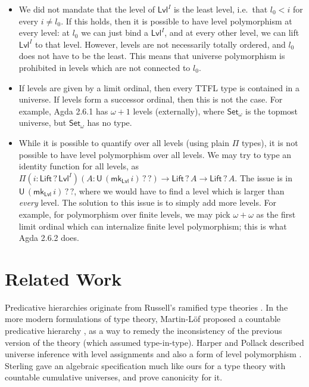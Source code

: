 \documentclass[a4paper,UKenglish,cleveref, autoref, thm-restate]{lipics-v2021}
\theoremstyle{remark}
\theoremstyle{definition}
\newcommand{\Set}[1]{\mathsf{Set_{#1}}}
\newcommand{\U}{\mathsf{U}}
\newcommand{\Lift}{\mathsf{Lift}}
\newcommand{\Lvl}{\mathsf{Lvl}}
\renewcommand{\U}{\mathsf{U}}
\newcommand{\msf}[1]{\mathsf{#1}}
\newcommand{\mkLvl}{\msf{mk}_{\Lvl}}
\begin{document}
\begin{itemize}
\item We did not mandate that the level of $\Lvl^I$ is the least level,
i.e.\ that $l_0 < i$ for every $i \neq l_0$. If this holds, then it is
possible to have level polymorphism at every level: at $l_0$ we can just bind
a $\Lvl^I$, and at every other level, we can lift $\Lvl^I$ to that
level. However, levels are not necessarily totally ordered, and $l_0$ does not
have to be the least. This means that universe polymorphism is prohibited in
levels which are not connected to $l_0$.

\item If levels are given by a limit ordinal, then every TTFL type is contained
in a universe. If levels form a successor ordinal, then this is not the
case. For example, Agda 2.6.1 has $\omega + 1$ levels (externally), where
$\Set{\omega}$ is the topmost universe, but $\Set{\omega}$ has no type.

\item
While it is possible to quantify over all levels (using plain $\Pi$ types), it
is not possible to have level polymorphism over all levels. We may try to type
an identity function for all levels, as $\Pi(i : \Lift\,?\,\Lvl^I)(A :
\U\,(\mkLvl\,i)\,?\,?) \to \Lift\,?\,A \to \Lift\,?\,A$. The issue is in
$\U\,(\mkLvl\,i)\,?\,?$, where we would have to find a level which is larger
than \emph{every} level. The solution to this issue is to simply add more
levels. For example, for polymorphism over finite levels, we may pick $\omega +
\omega$ as the first limit ordinal which can internalize finite level
polymorphism; this is what Agda 2.6.2 does.
\end{itemize}


\section{Related Work} \label{sec:related}

Predicative hierarchies originate from Russell's ramified type theories
\cite{principia}. In the more modern formulations of type theory, Martin-Löf
proposed a countable predicative hierarchy \cite{martinlof73predicative}, as a
way to remedy the inconsistency of the previous version of the theory (which
assumed type-in-type). Harper and Pollack described universe inference with
level assignments and also a form of level polymorphism \cite{harperpollack}.
Sterling \cite{sterling2019algebraic} gave an algebraic specification much like
ours for a type theory with countable cumulative universes, and prove canonicity
for it.
\end{document}
